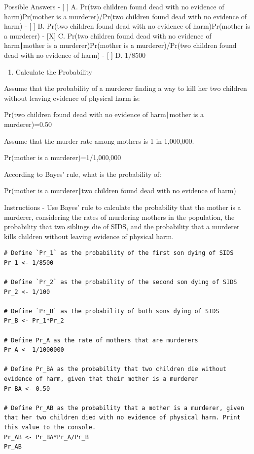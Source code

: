 \documentclass[
]{article}
\providecommand{\tightlist}{%
  \setlength{\itemsep}{0pt}\setlength{\parskip}{0pt}}
\begin{document}
Possible Answers - {[} {]} A. Pr(two children found dead with no
evidence of harm)Pr(mother is a murderer)/Pr(two children found dead
with no evidence of harm) - {[} {]} B. Pr(two children found dead with
no evidence of harm)Pr(mother is a murderer) - {[}X{]} C. Pr(two
children found dead with no evidence of harm∣mother is a
murderer)Pr(mother is a murderer)/Pr(two children found dead with no
evidence of harm) - {[} {]} D. 1/8500

\begin{enumerate}
\def\labelenumi{\arabic{enumi}.}
\setcounter{enumi}{3}
\tightlist
\item
  Calculate the Probability
\end{enumerate}

Assume that the probability of a murderer finding a way to kill her two
children without leaving evidence of physical harm is:

Pr(two children found dead with no evidence of harm∣mother is a
murderer)=0.50

Assume that the murder rate among mothers is 1 in 1,000,000.

Pr(mother is a murderer)=1/1,000,000

According to Bayes' rule, what is the probability of:

Pr(mother is a murderer∣two children found dead with no evidence of
harm)

Instructions - Use Bayes' rule to calculate the probability that the
mother is a murderer, considering the rates of murdering mothers in the
population, the probability that two siblings die of SIDS, and the
probability that a murderer kills children without leaving evidence of
physical harm.

\begin{verbatim}
# Define `Pr_1` as the probability of the first son dying of SIDS
Pr_1 <- 1/8500

# Define `Pr_2` as the probability of the second son dying of SIDS
Pr_2 <- 1/100

# Define `Pr_B` as the probability of both sons dying of SIDS
Pr_B <- Pr_1*Pr_2

# Define Pr_A as the rate of mothers that are murderers
Pr_A <- 1/1000000

# Define Pr_BA as the probability that two children die without evidence of harm, given that their mother is a murderer
Pr_BA <- 0.50

# Define Pr_AB as the probability that a mother is a murderer, given that her two children died with no evidence of physical harm. Print this value to the console.
Pr_AB <- Pr_BA*Pr_A/Pr_B
Pr_AB
\end{verbatim}
\end{document}
